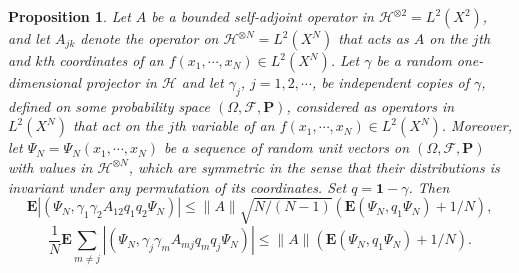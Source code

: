 \documentclass[12pt]{article}
\def\FC{\mathcal{F}}
\def\HC{\mathcal{H}}
\def\E{\mathbf{E}}
\def\P{\mathbf{P}}
\def\1{\mathbf{1}}
\def\ga{\gamma}
\newtheorem{prop}{Proposition}[section]
\newcommand{\Om}{\Omega}
\begin{document}
\begin{prop}
\label{GenKnowl2}
Let $A$ be a bounded self-adjoint operator in $\HC^{\otimes 2}=L^2(X^2)$, and let
$A_{jk}$ denote the operator on $\HC^{\otimes N}=L^2(X^N)$ that acts as $A$ on
 the $j$th and $k$th coordinates of an $f(x_1, \cdots, x_N)\in L^2(X^N)$. Let $\ga$ be
 a random one-dimensional projector in $\HC$ and let $\ga_j$, $j=1,2,\cdots$,  be independent copies of $\ga$,
 defined on some probability space $(\Om, \FC, \P)$,
 considered as operators in $L^2(X^N)$ that act on the $j$th variable of an $f(x_1, \cdots, x_N)\in L^2(X^N)$.
Moreover, let $\Psi_N=\Psi_N(x_1, \cdots, x_N)$ be a sequence of random unit vectors on $(\Om, \FC, \P)$
with values in $\HC^{\otimes N}$, which are symmetric in the sense that their distributions is invariant
under any permutation of its coordinates. Set $q=\1-\ga$. Then
 \begin{equation}
\label{eq2GenKnowl2}
\E  |(\Psi_N, \ga_1\ga_2A_{12} q_1 q_2\Psi_N)|
\le \|A\| \sqrt{N/(N-1)} (\E (\Psi_N, q_1 \Psi_N) +1/N),
\end{equation}
 \begin{equation}
\label{eq2GenKnowl3}
\frac{1}{N}  \E \sum_{m\neq j}  |(\Psi_N, \ga_j\ga_m A_{mj} q_m q_j\Psi_N)|
\le \|A\| (\E (\Psi_N, q_1 \Psi_N) +1/N).
\end{equation}
\end{prop}
\end{document}

